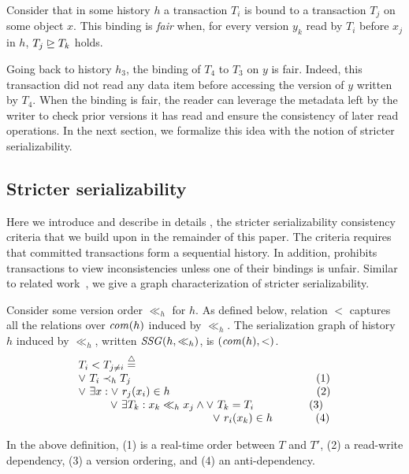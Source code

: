 \begin{definition}
  Consider that in some history $h$ a transaction $T_i$ is bound to a transaction $T_j$ on some object $x$.
  This binding is \emph{fair} when, for every version $y_k$ read by $T_i$ before $x_j$ in $h$, $T_j \mathrel{\unrhd} T_k$ holds.
\end{definition}

Going back to history $h_3$, the binding of $T_4$ to $T_3$ on $y$ is fair.
Indeed, this transaction did not read any data item before accessing the version of $y$ written by $T_4$.
When the binding is fair, the reader can leverage the metadata left by the writer to check prior versions it has read and ensure the consistency of later read operations.
In the next section, we formalize this idea with the notion of stricter serializability.

\subsection{Stricter serializability}
Here we introduce and describe in details \SPSER, the stricter serializability consistency criteria that we build upon in the remainder of this paper.
The \SSER criteria requires that committed transactions form a sequential history.
In addition, \SSER prohibits transactions to view inconsistencies unless one of their bindings is unfair.
Similar to related work~\cite{syn:db:1467}, we give a graph characterization of stricter serializability.

\begin{definition}
  Consider some version order $\ll_h$ for $h$.
  As defined below, relation $<$ captures all the relations over $\committed{h}$ induced by $\ll_h$.
  The serialization graph of history $h$ induced by $\ll_h$, written $\SSG(h,\ll_h)$, is $(\committed{h},<)$.
  \begin{displaymath}
    \begin{array}{l}
      T_i < T_{j \neq i}  \equaldef \\
      \lor~ T_i \hb_h T_j {\hspace{16.8em}\text{(1)}} \\
      \lor~ \exists x : \lor~ r_j(x_i) \in h {\hspace{13.3em}\text{(2)}} \\
      \hspace{2.9em}\lor~ \exists T_k : x_k \ll_h x_j \land \lor~T_k = T_i {\hspace{5em}\text{(3)}} \\
      \hspace{12.2em} \lor~ r_i(x_k) \in h {\hspace{3.9em}\text{(4)}}
    \end{array}
  \end{displaymath}  
\end{definition}
In the above definition, (1) is a real-time order between $T$ and $T'$, (2) a read-write dependency, (3) a version ordering, and (4) an anti-dependency.

